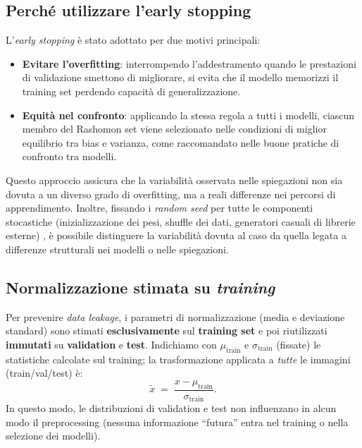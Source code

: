 \documentclass[12pt,a4paper,oneside]{report}
\numberwithin{figure}{chapter}
\numberwithin{table}{chapter}
\begin{document}
\subsection{Perché utilizzare l’early stopping}
L’\emph{early stopping} \citep{prechelt1998early} è stato adottato per due
motivi principali:
\begin{itemize}
      \item \textbf{Evitare l’overfitting}: interrompendo l’addestramento quando le prestazioni di validazione smettono di migliorare, si evita che il modello memorizzi il training set perdendo capacità di generalizzazione.
      \item \textbf{Equità nel confronto}: applicando la stessa regola a tutti i modelli, ciascun membro del Rashomon set viene selezionato nelle condizioni di miglior equilibrio tra bias e varianza, come raccomandato nelle buone pratiche di confronto tra modelli.

\end{itemize}

Questo approccio assicura che la variabilità osservata nelle spiegazioni non
sia dovuta a un diverso grado di overfitting, ma a reali differenze nei
percorsi di apprendimento. Inoltre, fissando i \emph{random seed} per tutte le
componenti stocastiche (inizializzazione dei pesi, shuffle dei dati, generatori
casuali di librerie esterne) \citep{reimers2017reporting}, è possibile
distinguere la variabilità dovuta al caso da quella legata a differenze
strutturali nei modelli o nelle spiegazioni.

\subsection{Normalizzazione stimata su \textit{training}}
Per prevenire \emph{data leakage}, i parametri di normalizzazione (media e deviazione
standard) sono stimati \textbf{esclusivamente} sul \textbf{training set} e poi
riutilizzati \textbf{immutati} su \textbf{validation} e \textbf{test}. Indichiamo con
$\mu_{\text{train}}$ e $\sigma_{\text{train}}$ (fissate) le statistiche calcolate sul training; la
trasformazione applicata a \emph{tutte} le immagini (train/val/test) è:
\[
      \tilde{x} \;=\; \frac{x - \mu_{\text{train}}}{\sigma_{\text{train}}}.
\]
In questo modo, le distribuzioni di validation e test non influenzano in alcun
modo il preprocessing (nessuna informazione “futura” entra nel training o nella
selezione dei modelli).
\end{document}
